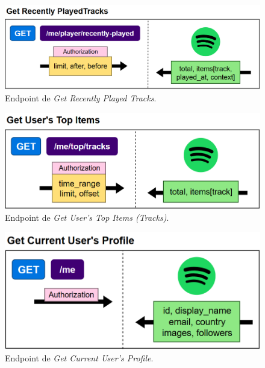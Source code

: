 \begin{figure}[H]
    \centering
    \includegraphics[width=\textwidth]{figures/endpoints/get_recently_played_tracks.png}
    \caption{Endpoint de \textit{Get Recently Played Tracks}.}
    \label{fig:get_recently_played_tracks}
\end{figure}

\begin{figure}[H]
    \centering
    \includegraphics[width=\textwidth]{figures/endpoints/get_users_top_items.png}
    \caption{Endpoint de \textit{Get User's Top Items (Tracks)}.}
    \label{fig:get_usr_top_items_tracks}
\end{figure}

\begin{figure}[H]
    \centering
    \includegraphics[width=\textwidth]{figures/endpoints/get_current_users_profile.png}
    \caption{Endpoint de \textit{Get Current User's Profile}.}
    \label{fig:get_current_usr_profile}
\end{figure}

